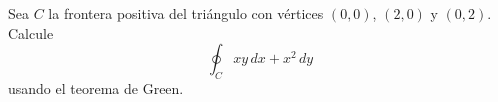 Sea $C$ la frontera positiva del triángulo con vértices $(0,0)$, $(2,0)$ y $(0,2)$. Calcule
\[
\oint_C xy\,dx+x^2\,dy
\]
usando el teorema de Green.
